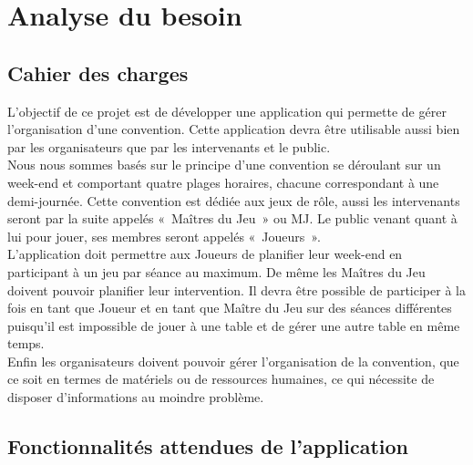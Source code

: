 \documentclass[11pt]{article}
\begin{document}
\newpage


\section{Analyse du besoin}


\subsection{Cahier des charges}
L'objectif de ce projet est de développer une application qui permette de gérer l'organisation d'une convention. Cette application devra être utilisable aussi bien par les organisateurs que par les intervenants et le public.  \\

Nous nous sommes basés sur le principe d'une convention se déroulant sur un week-end et comportant quatre plages horaires, chacune correspondant à une demi-journée. Cette convention est dédiée aux jeux de rôle, aussi les intervenants seront par la suite appelés «~Maîtres du Jeu~» ou MJ. Le public venant quant à lui pour jouer, ses membres seront appelés «~Joueurs~».\\ 

L'application doit permettre aux Joueurs de planifier leur week-end en participant à un jeu par séance au maximum. De même les Maîtres du Jeu doivent pouvoir planifier leur intervention. Il devra être possible de participer à la fois en tant que Joueur et en tant que Maître du Jeu sur des séances différentes puisqu'il est impossible de jouer à une table et de gérer une autre table en même temps.\\

Enfin les organisateurs doivent pouvoir gérer l'organisation de la convention, que ce soit en termes de matériels ou de ressources humaines, ce qui nécessite de disposer d'informations au moindre problème.\\




\subsection{Fonctionnalités attendues de l'application}
\end{document}
